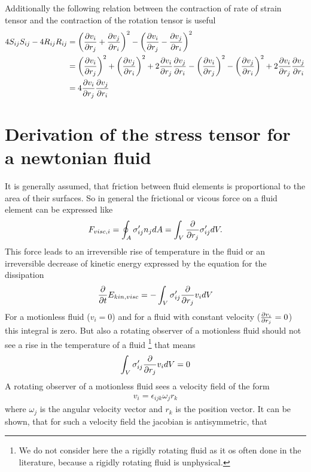 Additionally the following relation between the contraction of rate of strain
tensor and the contraction of the rotation tensor is useful
\begin{align}
\begin{split}
4 S_{ij}S_{ij} -  4 R_{ij}R_{ij} &=
\lra{\ppd{r_j}{v_i}+\ppd{r_i}{v_j}}^2 - \lra{\ppd{r_j}{v_i}-\ppd{r_i}{v_j}}^2\\ 
&=\lra{\ppd{r_j}{v_i}}^2 + \lra{\ppd{r_i}{v_j}}^2 +
2\ppd{r_j}{v_i}\ppd{r_i}{v_j}
-\lra{\ppd{r_j}{v_i}}^2 - \lra{\ppd{r_i}{v_j}}^2 +
2\ppd{r_j}{v_i}\ppd{r_i}{v_j}\\ 
&= 4 \ppd{r_j}{v_i}\ppd{r_i}{v_j}
\end{split}
\label{eq:rsrcontr}
\end{align}
\section{Derivation of the stress tensor for a newtonian fluid}
It is generally assumed, that friction between fluid elements is proportional
to the area of their surfaces. So in general the frictional or vicous force
on a fluid element can be expressed like
\begin{align}
F_{visc,i}= \oint_A \sigma'_{ij} n_j dA = \int_V \pd{r_j} \sigma'_{ij} dV.
\end{align}
This force leads to an irreversible rise of temperature in the fluid or an irreversible
decrease of kinetic energy expressed by the equation for the dissipation
\begin{align}
\pd{t} E_{kin,visc} = - \int_V \sigma'_{ij} \pd{r_j} v_i dV
\end{align}
For a motionless fluid ($v_i=0$) and for a fluid with constant velocity 
($\ppd{r_j}{v_i} = 0$) this integral is zero. But also a rotating observer
of a motionless fluid should not see a rise in the temperature of a fluid
\footnote{We do not consider here the a rigidly rotating fluid as it os often done
in the literature, because a rigidly rotating fluid is unphysical.}
that means
\begin{align}
 \int_V \sigma'_{ij} \pd{r_j} v_i dV = 0 \label{eq:nodiss}
\end{align}
A rotating observer of a motionless fluid sees a velocity field of the form
\begin{align}
v_i=\epsilon_{ijk}\omega_j r_k
\end{align}
where $\omega_j$ is the angular velocity vector and $r_k$ is the position vector.
It can be shown, that for such a velocity field the jacobian is antisymmetric, that 
